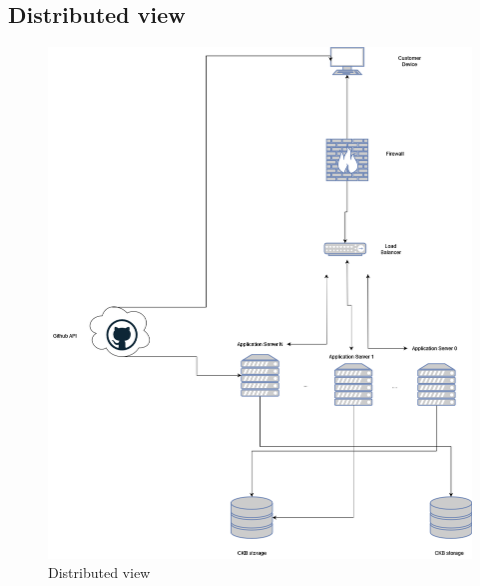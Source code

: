 \subsection{Distributed view}
    \begin{figure}
        \centering
        \includegraphics[width=\textwidth]{Images/DSV.drawio.png}
        \caption{Distributed view}
        \label{fig:enter-label}
    \end{figure}

\newpage
